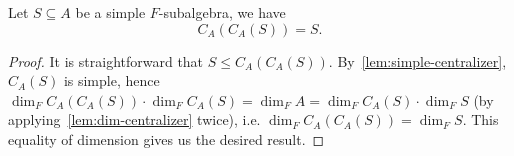  \begin{theorem}\label{thm:double-centralizer}
   Let $S\subseteq A$ be a simple $F$-subalgebra, we have
   \[
     C_{A}\left(C_{A}(S)\right) = S.
   \]
   \leanok
 \end{theorem}
 \begin{proof}
  It is straightforward that $S \le C_{A}\left(C_{A}(S)\right)$. By~\cref{lem:simple-centralizer}, $C_{A}(S)$ is simple, hence $\dim_{F}C_{A}\left(C_{A}(S)\right)\cdot \dim_{F}C_{A}(S)=\dim_{F}A=\dim_{F}C_{A}(S)\cdot \dim_{F}S$ (by applying~\cref{lem:dim-centralizer} twice), i.e. $\dim_{F}C_{A}\left(C_{A}(S)\right) = \dim_{F}S$. This equality of dimension gives us the desired result.
\end{proof}

 
